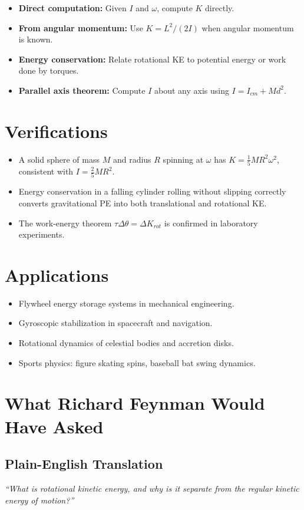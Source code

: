 \begin{itemize}
    \item \textbf{Direct computation:} Given $I$ and $\omega$, compute $K$ directly.
    \item \textbf{From angular momentum:} Use $K = L^2/(2I)$ when angular momentum is known.
    \item \textbf{Energy conservation:} Relate rotational KE to potential energy or work done by torques.
    \item \textbf{Parallel axis theorem:} Compute $I$ about any axis using $I = I_{cm} + Md^2$.
\end{itemize}
\section*{Verifications}

\begin{itemize}
    \item A solid sphere of mass $M$ and radius $R$ spinning at $\omega$ has $K = \frac{1}{5}MR^2\omega^2$, consistent with $I = \frac{2}{5}MR^2$.
    \item Energy conservation in a falling cylinder rolling without slipping correctly converts gravitational PE into both translational and rotational KE.
    \item The work-energy theorem $\tau\Delta\theta = \Delta K_{rot}$ is confirmed in laboratory experiments.
\end{itemize}
\section*{Applications}

\begin{itemize}
    \item Flywheel energy storage systems in mechanical engineering.
    \item Gyroscopic stabilization in spacecraft and navigation.
    \item Rotational dynamics of celestial bodies and accretion disks.
    \item Sports physics: figure skating spins, baseball bat swing dynamics.
\end{itemize}
\section*{What Richard Feynman Would Have Asked}

\subsection*{Plain-English Translation}
\textit{``What is rotational kinetic energy, and why is it separate from the regular kinetic energy of motion?''}


